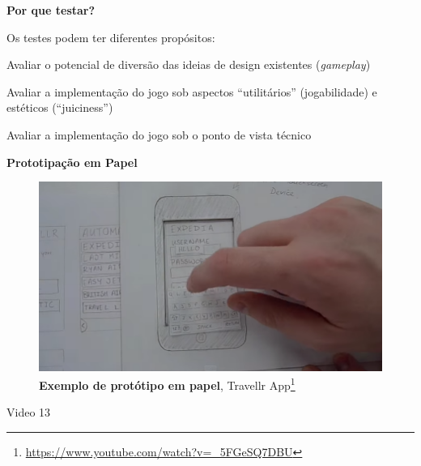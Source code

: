 \expandafter\documentclass\expandafter[table, usenames, svgnames, dvipsnames, \classopts]{beamer}
\begin{document}
\begin{frame}{\textbf{Por que testar?}}

	Os testes podem ter diferentes propósitos:

	\begin{outline}
		\1 Avaliar o potencial de diversão das ideias de design existentes (\textit{gameplay})
			
		\vspace{1em}
			
		\1 Avaliar a implementação do jogo sob aspectos ``utilitários'' (jogabilidade) e estéticos (``juiciness'')
		
		\vspace{1em}

		\1 Avaliar a implementação do jogo sob o ponto de vista técnico
		
	\end{outline}

\end{frame}

\begin{frame}{\textbf{Prototipação em Papel}}

	\begin{figure}
	    \centering
        \includegraphics[width=0.8\paperwidth]{paper-prototype}
        \caption{\textbf{Exemplo de protótipo em papel}, Travellr App\footnote{\url{https://www.youtube.com/watch?v=_5FGeSQ7DBU}}}
    \end{figure}

    \begin{center}
    	Video 13
    \end{center}

    \vspace{2em}

\end{frame}
\end{document}
